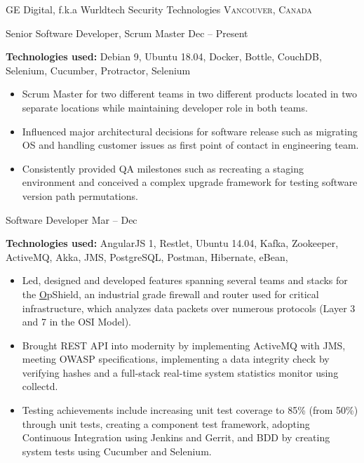 \documentclass[10pt,a4paper]{article}
\begin{document}
\headedsection  %
  {{GE Digital, f.k.a Wurldtech Security Technologies}}
  {\textsc{Vancouver, Canada}} {%
  \headedsubsection
    {Senior Software Developer, Scrum Master}
    {Dec  -- Present}
   {\noindent
    
   \textbf{Technologies used:}   Debian 9, Ubuntu 18.04, Docker, Bottle, CouchDB, Selenium, Cucumber, Protractor, Selenium\begin{itemize}  
\item Scrum Master for two different teams in two different products located in two separate locations while maintaining developer role in both teams.
\item Influenced major architectural decisions for software release such as migrating OS and handling customer issues as first point of contact in engineering team.
\item Consistently provided QA milestones such as recreating a staging environment and conceived a complex upgrade framework for testing software version path permutations. 
\end{itemize}}
    
  \headedsubsection
    {Software Developer}
    {Mar  -- Dec }
    {\noindent
    
   \textbf{Technologies used:}   AngularJS 1, Restlet, Ubuntu 14.04, Kafka, Zookeeper, ActiveMQ, Akka, JMS, PostgreSQL, Postman, Hibernate, eBean, \begin{itemize}  
\item Led, designed and developed features spanning several teams and stacks for the \href{https://www.ge.com/digital/asset/opshield-ge-digital}OpShield, an industrial
grade firewall and router used for critical infrastructure, which analyzes data packets over numerous protocols (Layer
3 and 7 in the OSI Model).
\item Brought REST API into modernity by implementing ActiveMQ
with JMS, meeting OWASP specifications, implementing a data integrity check by verifying hashes and a full-stack real-time system statistics monitor using collectd.
\item Testing achievements include increasing unit test coverage to 85\% (from 50\%) through unit tests, creating a component test framework, adopting Continuous Integration using Jenkins and Gerrit, and BDD by creating system tests using Cucumber and Selenium.
\end{itemize}}
}
\end{document}
